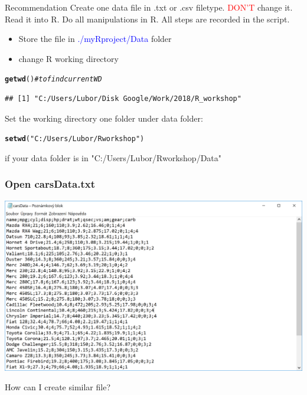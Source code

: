 \documentclass[12pt]{beamer}\usepackage[]{graphicx}\usepackage[]{color}
\makeatletter
\newcommand{\hlstr}[1]{\textcolor[rgb]{0.192,0.494,0.8}{#1}}%
\newcommand{\hlcom}[1]{\textcolor[rgb]{0.678,0.584,0.686}{\textit{#1}}}%
\newcommand{\hlstd}[1]{\textcolor[rgb]{0.345,0.345,0.345}{#1}}%
\newcommand{\hlkwd}[1]{\textcolor[rgb]{0.737,0.353,0.396}{\textbf{#1}}}%
\newenvironment{kframe}{%
 \def\at@end@of@kframe{}%
 \ifinner\ifhmode%
  \def\at@end@of@kframe{\end{minipage}}%
  \begin{minipage}{\columnwidth}%
 \fi\fi%
 \def\FrameCommand##1{\hskip\@totalleftmargin \hskip-\fboxsep
 \colorbox{shadecolor}{##1}\hskip-\fboxsep
     \hskip-\linewidth \hskip-\@totalleftmargin \hskip\columnwidth}%
 \MakeFramed {\advance\hsize-\width
   \@totalleftmargin\z@ \linewidth\hsize
   \@setminipage}}%
 {\par\unskip\endMakeFramed%
 \at@end@of@kframe}
\newenvironment{knitrout}{}{} %
\makeatother
\begin{document}

\begin{frame}[fragile]

\begin{block}{Recommendation}
Create one data file in .txt or .csv filetype. \textcolor{red}{DON'T} change it. Read it into R. Do all manipulations in R. All steps are recorded in the script.
\end{block}

\begin{itemize}
 \item Store the file in \textcolor{blue}{./myRproject/Data} folder 
 \item change R working directory
\end{itemize}
\begin{knitrout}
\color{fgcolor}\begin{kframe}
\begin{alltt}
\hlkwd{getwd}\hlstd{()} \hlcom{#to find current WD}
\end{alltt}
\begin{verbatim}
## [1] "C:/Users/Lubor/Disk Google/Work/2018/R_workshop"
\end{verbatim}
\end{kframe}
\end{knitrout}
 Set the working directory one folder under data folder:
\begin{knitrout}
\color{fgcolor}\begin{kframe}
\begin{alltt}
\hlkwd{setwd}\hlstd{(}\hlstr{"C:/Users/Lubor/Rworkshop"}\hlstd{)}
\end{alltt}
\end{kframe}
\end{knitrout}
if your data folder is in "C:/Users/Lubor/Rworkshop/Data"

\end{frame}


\begin{frame}
\frametitle{Open carsData.txt}
\includegraphics[width=\textwidth,height=\textheight,keepaspectratio]{./Images/04_inspectTXT}

 How can I create similar file?
\end{frame}
\end{document}
